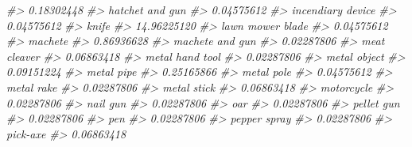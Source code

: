 \documentclass[
]{krantz}
\makeatletter
\newenvironment{Shaded}{\begin{snugshade}}{\end{snugshade}}
\newcommand{\CommentTok}[1]{\textcolor[rgb]{0.37,0.37,0.37}{\textit{#1}}}
\newenvironment{kframe}{%
\medskip{}
\setlength{\fboxsep}{.8em}
 \def\at@end@of@kframe{}%
 \ifinner\ifhmode%
  \def\at@end@of@kframe{\end{minipage}}%
  \begin{minipage}{\columnwidth}%
 \fi\fi%
 \def\FrameCommand##1{\hskip\@totalleftmargin \hskip-\fboxsep
 \colorbox{shadecolor}{##1}\hskip-\fboxsep
     \hskip-\linewidth \hskip-\@totalleftmargin \hskip\columnwidth}%
 \MakeFramed {\advance\hsize-\width
   \@totalleftmargin\z@ \linewidth\hsize
   \@setminipage}}%
 {\par\unskip\endMakeFramed%
 \at@end@of@kframe}
\renewenvironment{Shaded}{\begin{kframe}}{\end{kframe}}
\makeatother
\begin{document}
\begin{Shaded}
\begin{Highlighting}[]
\CommentTok{\#\textgreater{}                       0.18302448 }
\CommentTok{\#\textgreater{}                  hatchet and gun }
\CommentTok{\#\textgreater{}                       0.04575612 }
\CommentTok{\#\textgreater{}                incendiary device }
\CommentTok{\#\textgreater{}                       0.04575612 }
\CommentTok{\#\textgreater{}                            knife }
\CommentTok{\#\textgreater{}                      14.96225120 }
\CommentTok{\#\textgreater{}                 lawn mower blade }
\CommentTok{\#\textgreater{}                       0.04575612 }
\CommentTok{\#\textgreater{}                          machete }
\CommentTok{\#\textgreater{}                       0.86936628 }
\CommentTok{\#\textgreater{}                  machete and gun }
\CommentTok{\#\textgreater{}                       0.02287806 }
\CommentTok{\#\textgreater{}                     meat cleaver }
\CommentTok{\#\textgreater{}                       0.06863418 }
\CommentTok{\#\textgreater{}                  metal hand tool }
\CommentTok{\#\textgreater{}                       0.02287806 }
\CommentTok{\#\textgreater{}                     metal object }
\CommentTok{\#\textgreater{}                       0.09151224 }
\CommentTok{\#\textgreater{}                       metal pipe }
\CommentTok{\#\textgreater{}                       0.25165866 }
\CommentTok{\#\textgreater{}                       metal pole }
\CommentTok{\#\textgreater{}                       0.04575612 }
\CommentTok{\#\textgreater{}                       metal rake }
\CommentTok{\#\textgreater{}                       0.02287806 }
\CommentTok{\#\textgreater{}                      metal stick }
\CommentTok{\#\textgreater{}                       0.06863418 }
\CommentTok{\#\textgreater{}                       motorcycle }
\CommentTok{\#\textgreater{}                       0.02287806 }
\CommentTok{\#\textgreater{}                         nail gun }
\CommentTok{\#\textgreater{}                       0.02287806 }
\CommentTok{\#\textgreater{}                              oar }
\CommentTok{\#\textgreater{}                       0.02287806 }
\CommentTok{\#\textgreater{}                       pellet gun }
\CommentTok{\#\textgreater{}                       0.02287806 }
\CommentTok{\#\textgreater{}                              pen }
\CommentTok{\#\textgreater{}                       0.02287806 }
\CommentTok{\#\textgreater{}                     pepper spray }
\CommentTok{\#\textgreater{}                       0.02287806 }
\CommentTok{\#\textgreater{}                         pick{-}axe }
\CommentTok{\#\textgreater{}                       0.06863418 }

\end{Highlighting}
\end{Shaded}
\end{document}
